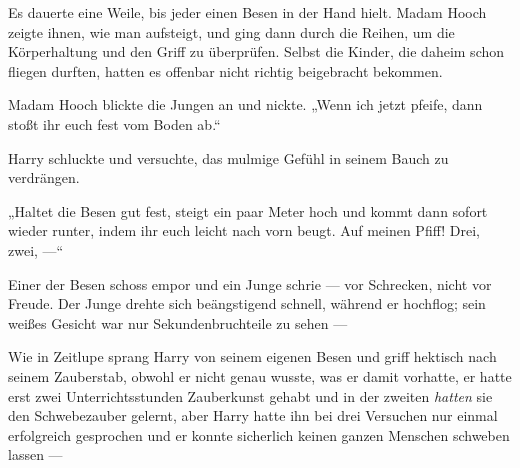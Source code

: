 Es dauerte eine Weile, bis jeder einen Besen in der Hand hielt. Madam Hooch zeigte ihnen, wie man aufsteigt, und ging dann durch die Reihen, um die Körperhaltung und den Griff zu überprüfen. Selbst die Kinder, die daheim schon fliegen durften, hatten es offenbar nicht richtig beigebracht bekommen.

Madam Hooch blickte die Jungen an und nickte.
„Wenn ich jetzt pfeife, dann stoßt ihr euch fest vom Boden ab.“

Harry schluckte und versuchte, das mulmige Gefühl in seinem Bauch zu verdrängen.

„Haltet die Besen gut fest, steigt ein paar Meter hoch und kommt dann sofort wieder runter, indem ihr euch leicht nach vorn beugt. Auf meinen Pfiff! Drei, zwei, —“

Einer der Besen schoss empor und ein Junge schrie — vor Schrecken, nicht vor Freude. Der Junge drehte sich beängstigend schnell, während er hochflog; sein weißes Gesicht war nur Sekundenbruchteile zu sehen —

Wie in Zeitlupe sprang Harry von seinem eigenen Besen und griff hektisch nach seinem Zauberstab, obwohl er nicht genau wusste, was er damit vorhatte, er hatte erst zwei Unterrichtsstunden Zauberkunst gehabt und in der zweiten \emph{hatten} sie den Schwebezauber gelernt, aber Harry hatte ihn bei drei Versuchen nur einmal erfolgreich gesprochen und er konnte sicherlich keinen ganzen Menschen schweben lassen —

